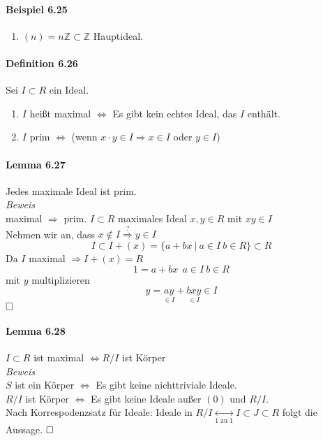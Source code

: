 \documentclass{scrartcl}
\begin{document}
\paragraph{Beispiel 6.25}
\begin{enumerate}
\item $(n) = n\mathbb{Z} \subset \mathbb{Z}$ Hauptideal.
\end{enumerate}

\paragraph{Definition 6.26}
Sei $I \subset R$ ein Ideal.
\begin{enumerate}
\item $I$ heißt maximal $\Leftrightarrow$ Es gibt kein echtes Ideal, das $I$
  enthält.
\item $I$ prim $\Leftrightarrow$ (wenn $x \cdot y \in I \Rightarrow x \in I$
  oder $y \in I$)
\end{enumerate}

\paragraph{Lemma 6.27}
Jedes maximale Ideal ist prim. \\
\textit{Beweis} \\
maximal $\Rightarrow$ prim. $I \subset R$ maximales Ideal $x,y \in R$ mit $xy
\in I$ \\
Nehmen wir an, dass $x \notin I \overset{?}{\Rightarrow} y \in I$
\[
  I \subset I + (x) = \{a + bx ~|~ a \in I~b \in R\} \subset R
\]
Da $I$ maximal $\Rightarrow I + (x) = R$
\[
  1 = a + bx ~~ a \in I ~ b \in R
\]
mit $y$ multiplizieren
\[
  y = \underset{\in I}{ay} + \underset{\in I}{bxy} \in I
\]
$\hfill \square$

\paragraph{Lemma 6.28}
$I \subset R$ ist maximal $\Leftrightarrow R/I$ ist Körper \\
\textit{Beweis} \\
$S$ ist ein Körper  $\Leftrightarrow$ Es gibt keine nichttriviale Ideale. \\
$R/I$ ist Körper $\Leftrightarrow$ Es gibt keine Ideale außer $(0)$ und $R/I$.\\
Nach Korrespodenzsatz für Ideale: Ideale in
$R/I \underset{\text{1 zu 1}}{\leftrightarrow} I \subset J
\subset R$ folgt die Aussage.
$\hfill \square$
\end{document}
